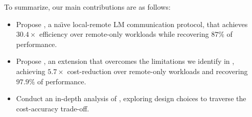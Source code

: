 To summarize, our main contributions are as follows:
\begin{itemize}
    \vspace{-0.5em}\item Propose \naive, a na\"{\i}ve local-remote LM communication protocol, that achieves $30.4\times$ efficiency over remote-only workloads while recovering $87\%$ of performance.
    \vspace{-0.5em}\item Propose \system, an extension that overcomes the limitations we identify in \naive, achieving $5.7\times$  cost-reduction over remote-only workloads and recovering $97.9\%$ of performance.
    \vspace{-0.5em}\item Conduct an in-depth analysis of \system, exploring design choices to traverse the cost-accuracy trade-off. 
    
\end{itemize}


